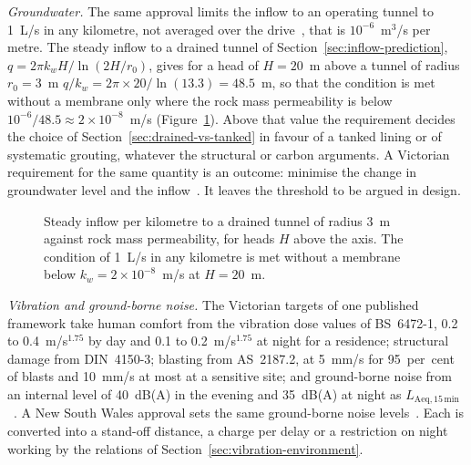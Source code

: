 \emph{Groundwater.} The same approval limits the inflow to an operating tunnel
to 1~L/s in any kilometre, not averaged over the drive~\citep{nsw2020m4m5coa},
that is $10^{-6}$~m$^3$/s per metre. The steady inflow to a drained tunnel of
Section~\ref{sec:inflow-prediction}, $q = 2\pi k_w H/\ln(2H/r_0)$, gives for a
head of $H = 20$~m above a tunnel of radius $r_0 = 3$~m
$q/k_w = 2\pi \times 20/\ln(13.3) = 48.5$~m, so that the condition is met
without a membrane only where the rock mass permeability is below
$10^{-6}/48.5 \approx 2 \times 10^{-8}$~m/s (Figure~\ref{fig:inflow-permeability}). Above that value the requirement
decides the choice of Section~\ref{sec:drained-vs-tanked} in favour of a tanked
lining or of systematic grouting, whatever the structural or carbon arguments.
A Victorian requirement for the same quantity is an outcome: minimise the
change in groundwater level and the inflow~\citep{wda2017ees}. It leaves
the threshold to be argued in design.

\begin{figure}[htbp]
\centering
{}
\caption{Steady inflow per kilometre to a drained tunnel of radius 3~m against rock mass permeability, for heads $H$ above the axis. The condition of 1~L/s in any kilometre is met without a membrane below $k_w = 2 \times 10^{-8}$~m/s at $H = 20$~m.}
\label{fig:inflow-permeability}
\end{figure}

\emph{Vibration and ground-borne noise.} The Victorian targets of one published
framework take human comfort from the vibration dose values of BS~6472-1,
0.2 to 0.4~m/s$^{1.75}$ by day and 0.1 to 0.2~m/s$^{1.75}$ at night for a
residence; structural damage from DIN~4150-3; blasting from AS~2187.2, at
5~mm/s for 95~per~cent of blasts and 10~mm/s at most at a sensitive site; and
ground-borne noise from an internal level of 40~dB(A) in the evening and
35~dB(A) at night as $L_{\mathrm{Aeq},15\,\mathrm{min}}$~\citep{wda2017ees}.
A New South Wales approval sets the same ground-borne noise
levels~\citep{nsw2020m4m5coa}. Each is converted into a stand-off distance, a
charge per delay or a restriction on night working by the relations of
Section~\ref{sec:vibration-environment}.

